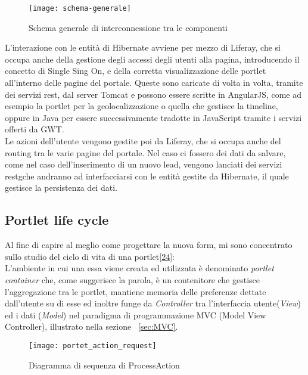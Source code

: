 \begin{figure}[h]
	\centering
	\texttt{[image: schema-generale]}
	\caption{Schema generale di interconnessione tra le componenti}
	\label{schema-generale}
\end{figure}
L'interazione con le entità di Hibernate avviene per mezzo di Liferay, che si occupa anche della gestione degli accessi degli utenti alla pagina, introducendo il concetto di Single Sing On, e della corretta visualizzazione delle \gls{portlet} all'interno delle pagine del portale. Queste sono caricate di volta in volta, tramite dei servizi \gls{rest}\glsfirstoccur, dal server Tomcat e possono essere scritte in AngularJS, come ad esempio la \gls{portlet} per la geolocalizzazione o quella che gestisce la timeline, oppure in Java per essere successivamente tradotte in JavaScript tramite i servizi offerti da GWT.\\
Le azioni dell'utente vengono gestite poi da Liferay, che si occupa anche del routing tra le varie pagine del portale. Nel caso ci fossero dei dati da salvare, come nel caso dell'inserimento di un nuovo lead, vengono lanciati dei servizi \gls{restg}che andranno ad interfacciarsi con le entità gestite da Hibernate, il quale gestisce la persistenza dei dati.\\

\subsection{Portlet life cycle}
Al fine di capire al meglio come progettare la nuova form, mi sono concentrato sullo studio del ciclo di vita di una \gls{portlet}\hyperlink{24}{[24]}:\\
L'ambiente in cui una essa viene creata ed utilizzata è denominato \emph{portlet container} che, come suggerisce la parola, è un contenitore che gestisce l'aggregazione tra le \gls{portlet}, mantiene memoria delle preferenze dettate dall'utente su di esse ed inoltre funge da \emph{Controller} tra l'interfaccia utente(\emph{View}) ed i dati (\emph{Model}) nel paradigma di programmazione MVC (Model View Controller), illustrato nella sezione ~\ref{sec:MVC}.\\
\newpage
\begin{figure}[h]
	\centering
	\texttt{[image: portet\_action\_request]}
	\caption{Diagramma di sequenza di ProcessAction}
	\label{process-action}
\end{figure}

